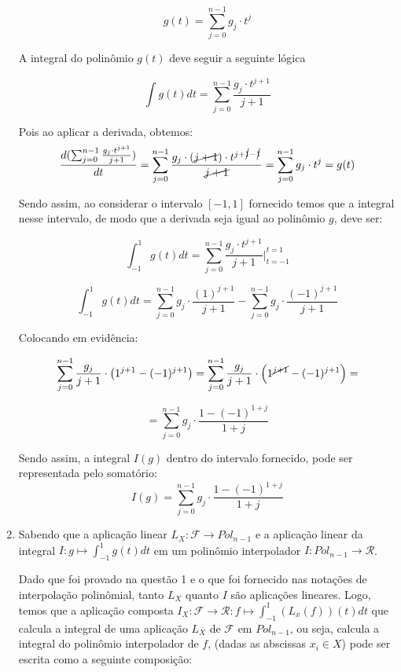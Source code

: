 \documentclass[12pt]{article}
\begin{document}
\begin{enumerate}[1.]
    $$g(t) = \sum_{j=0}^{n-1} g_j \cdot t^j $$
    
    
    A integral do polinômio $g(t)$ deve seguir a seguinte lógica
    
    $$\int g(t)dt = \sum_{j=0}^{n-1} \frac{g_j \cdot t^{j+1}}{j+1}  $$
    
    Pois ao aplicar a derivada, obtemos:
    $$ \dfrac {d( \sum_{j=0}^{n-1} \frac{g_j \cdot t^{j+1}}{j+1} ) }{dt} = \sum_{j=0}^{n-1} \frac{g_j \cdot (\cancel{j+1}) \cdot t^{j +\cancel{1} - \cancel{1}}}{\cancel{j+1}} =  \sum_{j=0}^{n-1} g_j \cdot t^j = g(t)  $$
    
    Sendo assim, ao considerar o intervalo $ [-1,1]$ fornecido temos que a integral nesse intervalo, de modo que a derivada seja igual ao polinômio $g$, deve ser:
    
    $$\int_{-1}^{1} g(t)dt = \sum_{j=0}^{n-1} \frac{g_j \cdot t^{j+1}}{j+1} \bigg|_{t=-1}^{t=1}  $$
    

    
    $$\int_{-1}^{1} g(t)dt  =  \sum_{j=0}^{n-1} g_j \cdot \frac{(1)^{j+1}}{j+1} - \sum_{j=0}^{n-1} g_j \cdot \frac{(-1)^{j+1}}{j+1} $$
        
    Colocando em evidência:
    
    $$\sum_{j=0}^{n-1} \frac{g_j}{j+1}  \cdot \left( 1^{j+1} - (-1)^{j+1} \right)  = \sum_{j=0}^{n-1} \frac{g_j}{j+1}  \cdot \left( 1^{\cancel{j+1}} - (-1)^{j+1} \right) =$$
        
    $$=  \sum_{j=0}^{n-1} g_j \cdot \frac{1- (-1)^{1+j}}{1+j} $$
        
    Sendo assim, a integral $I(g)$ dentro do intervalo fornecido, pode ser representada pelo somatório: 
    $$ I(g) = \sum_{j=0}^{n-1} g_j \cdot \frac{1- (-1)^{1+j}}{1+j}  $$
    
    
    
    \bigskip\bigskip
    \item    
    
     Sabendo que a aplicação linear $L_X: \mathcal{F} \rightarrow Pol_{n-1} $
     e a aplicação linear da integral $I:g \mapsto \int_{-1}^{1} g(t) dt$ em um polinômio interpolador $I:Pol_{n-1} \rightarrow \mathcal{R} $.
     
     Dado que foi provado na questão 1 e o que foi fornecido nas notações de interpolação polinômial, tanto $L_X$ quanto $I$ são aplicações lineares. Logo, temos que a aplicação composta $I_X: \mathcal{F} \rightarrow \mathcal{R} : f \mapsto \int_{-1}^{1} \left( L_x(f) \right)(t) dt $ que calcula a integral de uma aplicação $L_X$ de $\mathcal{F}$ em $Pol_{n-1}$, ou seja, calcula a integral do polinômio interpolador de $f$,  (dadas as abscissas $x_i \in X$) pode ser escrita como a seguinte composição:
     

\end{enumerate}
\end{document}
